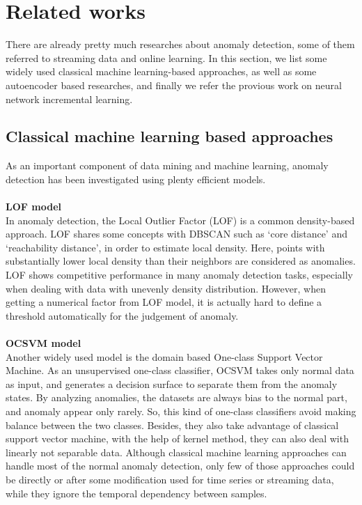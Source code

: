 \chapter{Related works}
\label{chap:related works}

There are already pretty much researches about anomaly detection, some of them referred to streaming data and online learning. In this section, we list some widely used classical machine learning-based approaches, as well as some autoencoder based researches, and finally we refer the provious work on neural network incremental learning.

\section{Classical machine learning based approaches}
\label{sec:Classical machine learning based approaches}

As an important component of data mining and machine learning, anomaly detection has been investigated using plenty efficient models.\\\\
\textbf{LOF model} \\

In anomaly detection, the Local Outlier Factor (LOF) is a common density-based approach. LOF shares some concepts with DBSCAN such as ‘core distance’ and ‘reachability distance’, in order to estimate local density. Here, points with substantially lower local density than their neighbors are considered as anomalies. LOF shows competitive performance in many anomaly detection tasks, especially when dealing with data with unevenly density distribution. However, when getting a numerical factor from LOF model, it is actually hard to define a threshold automatically for the judgement of anomaly.\\\\

\textbf{OCSVM model} \\

Another widely used model is the domain based One-class Support Vector Machine. As an unsupervised one-class classifier, OCSVM takes only normal data as input, and generates a decision surface to separate them from the anomaly states.  By analyzing anomalies, the datasets are always bias to the normal part, and anomaly appear only rarely. So, this kind of one-class classifiers avoid making balance between the two classes. Besides, they also take advantage of classical support vector machine, with the help of kernel method, they can also deal with linearly not separable data.
Although classical machine learning approaches can handle most of the normal anomaly detection, only few of those approaches could be directly or after some modification used for time series or streaming data, while they ignore the temporal dependency between samples.



